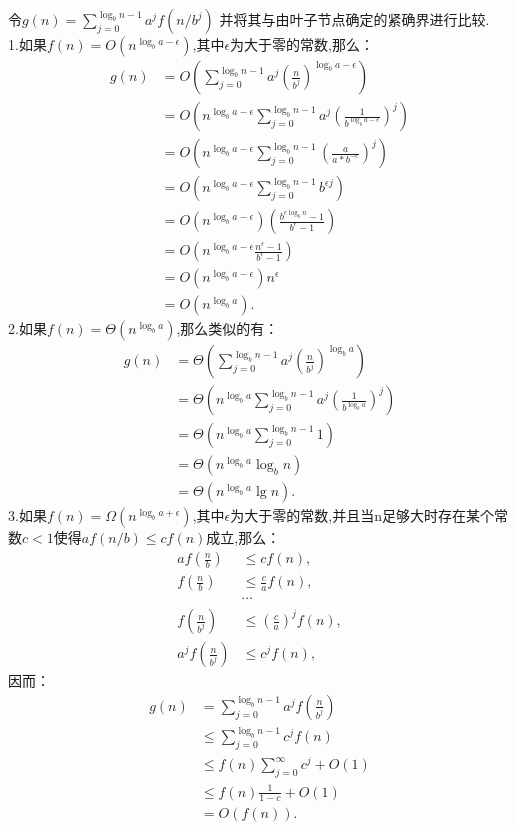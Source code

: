 \documentclass[a4paper]{article}%
\begin{document}
令$g(n)=\sum_{j=0}^{\log_bn-1}a^jf(n/b^j)$
并将其与由叶子节点确定的紧确界进行比较.\\
1.如果$f(n)=O(n^{\log _ba-\epsilon})$,其中$\epsilon$为大于零的常数,那么：
\begin{align*}
g(n)&=O(\sum^{\log_bn-1}_{j=0}a^j(\frac{n}{b^j})^{\log_ba-\epsilon}) \\
    &=O(n^{\log_ba-\epsilon}\sum^{\log_bn-1}_{j=0}a^j(\frac{1}{b^{\log_ba-\epsilon}})^j) \\
    &=O(n^{\log_ba-\epsilon}\sum^{\log_bn-1}_{j=0}(\frac{a}{a*b^{-\epsilon}})^j) \\
    &=O(n^{\log_ba-\epsilon}\sum^{\log_bn-1}_{j=0}b^{\epsilon j})\\
    &=O(n^{\log_ba-\epsilon})(\frac{b^{\epsilon\log_bn}-1}{b^{\epsilon}-1})\\
    &=O(n^{\log_ba-\epsilon}\frac{n^{\epsilon}-1}{b^{\epsilon}-1})\\
    &=O(n^{\log_ba-\epsilon})n^{\epsilon}\\
    &=O(n^{\log_ba}) .\label{eq:cubesum}
\end{align*}
2.如果$f(n)=\Theta(n^{\log _ba})$,那么类似的有：
\begin{align*}
g(n)&=\Theta(\sum_{j=0}^{\log_bn-1}a^j(\frac{n}{b^j})^{\log_ba}) \\
    &=\Theta(n^{\log_ba}\sum^{\log_bn-1}_{j=0}a^j(\frac{1}{b^{\log_ba}})^j) \\
    &=\Theta(n^{\log_ba}\sum^{\log_bn-1}_{j=0}1) \\
    &=\Theta(n^{\log_ba}\log_bn) \\
    &=\Theta(n^{\log_ba}\lg n) .
\end{align*}
3.如果$f(n)=\Omega(n^{\log _ba+\epsilon})$,其中$\epsilon$为大于零的常数,并且当n足够大时存在某个常数$c<1$使得$af(n/b)\le cf(n)$成立,那么：
\begin{align*}
af(\frac{n}{b})&\le cf(n),\\
f(\frac{n}{b})&\le\frac{c}{a}f(n),\\
&\cdots\\
f(\frac{n}{b^j})&\le(\frac{c}{a})^jf(n),\\
a^jf(\frac{n}{b^j})&\le c^jf(n),
\end{align*}
因而：
\begin{align*}
g(n) &=\sum^{\log_bn-1}_{j=0}a^jf(\frac{n}{b^j})\\
     &\le \sum^{\log_bn-1}_{j=0}c^jf(n)\\
     &\le f(n)\sum^{\infty}_{j=0}c^j+O(1)\\
     &\le f(n)\frac{1}{1-c}+O(1)\\
     &=O(f(n)).
\end{align*}
\end{document}
